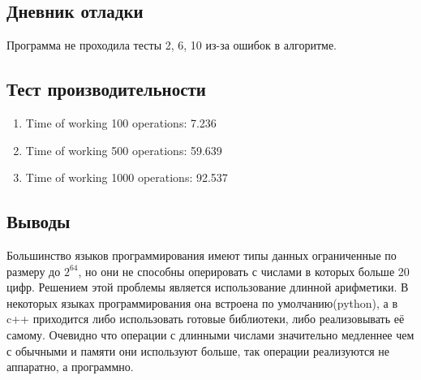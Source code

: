 \documentclass[12pt]{article}
\begin{document}
\subsection*{Дневник отладки}

Программа не проходила тесты 2, 6, 10 из-за ошибок в алгоритме.

\subsection*{Тест производительности}

\begin{enumerate}
	\item Time of working 100 operations: 7.236
	\item Time of working 500 operations: 59.639
	\item Time of working 1000 operations: 92.537
	
\end{enumerate}
\subsection*{Выводы}
Большинство языков программирования имеют типы данных ограниченные по размеру до $2^{64}$, но они не способны оперировать с числами в которых больше 20 цифр. Решением этой проблемы является использование длинной арифметики. В некоторых языках программирования она встроена по умолчанию(python), а в c++ приходится либо использовать готовые библиотеки, либо реализовывать её самому. Очевидно что операции с длинными числами значительно медленнее чем с обычными и памяти они используют больше, так операции реализуются не аппаратно, а программно.
\end{document}
